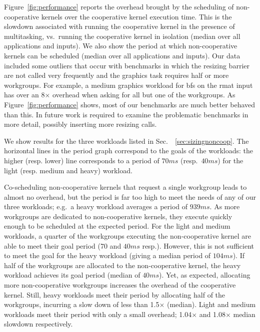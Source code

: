 \documentclass[sigconf]{acmart}
\newcommand{\myfiglong}{Figure~}
\newcommand{\mysec}{Sec.~}
\begin{document}
{ \myfiglong\ref{fig:performance} reports the
overhead brought by the scheduling of non-cooperative kernels over the
cooperative kernel execution time.  This is the slowdown associated
with running the cooperative kernel in the presence of multitasking,
vs.\ running the cooperative kernel in isolation (median over all
applications and inputs).  We also show the period at which
non-cooperative kernels can be scheduled (median over all applications
and inputs). Our data included some outliers that occur with
benchmarks in which the resizing barrier are not called very
frequently and the graphics task requires half or more workgroups. For
example, a medium graphics workload for bfs on the rmat input has over
an 8$\times$ overhead when asking for all but one of the
workgroups. As \myfiglong\ref{fig:performance} shows, most of our
benchmarks are much better behaved than this. In future work
is required to examine the problematic benchmarks in more detail,
possibly inserting more resizing calls.

We show results for the three workloads listed in
\mysec~\ref{sec:sizingnoncoop}. The horizontal lines in the period
graph correspond to the goals of the workloads: the higher
(resp. lower) line corresponds to a period of $70\mathit{ms}$ (resp.\ $40\mathit{ms}$) for
the light (resp. medium and heavy) workload.

Co-scheduling non-cooperative kernels that request a single workgroup
leads to almost no overhead, but the period is far too high to meet
the needs of any of our three workloads; e.g.\ a heavy workload
averages a period of $939\mathit{ms}$. As more workgroups are dedicated to
non-cooperative kernels, they execute quickly enough to be scheduled
at the expected period. For the light and medium workloads, a quarter
of the workgroups executing the non-cooperative kernel are able to
meet their goal period (70 and $40\mathit{ms}$ resp.). However, this is not
sufficient to meet the goal for the heavy workload (giving a median
period of $104\mathit{ms}$). If half of the workgroups are allocated to the
non-cooperative kernel, the heavy workload achieves its goal period
(median of $40\mathit{ms}$).
%
Yet, as expected, allocating more non-cooperative workgroups increases
the overhead of the cooperative kernel.
%
Still, heavy workloads meet their period by allocating half
of the workgroups, incurring a slow down of less than
1.5$\times$ (median). Light and medium workloads meet their period
with only a small overhead; 1.04$\times$ and 1.08$\times$ median
slowdown respectively.

}
\end{document}
